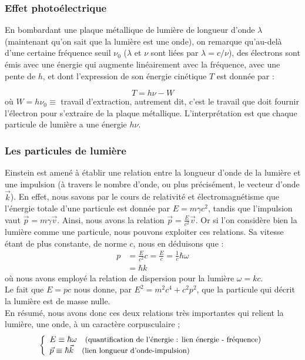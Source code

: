 \documentclass{book}
\begin{document}
\subsubsection{Effet photoélectrique}
En bombardant une plaque métallique de lumière de longueur d'onde $\lambda$ (maintenant qu'on sait que la lumière est une onde), on remarque qu'au-delà d'une certaine fréquence seuil $\nu_0$ ($\lambda$ et $\nu$ sont liées par $\lambda = c/\nu$), des électrons sont émis avec une énergie qui augmente linéairement avec la fréquence, avec une pente de $h$, et dont l'expression de son énergie cinétique $T$ est donnée par :

$$ T = h\nu - W$$
où $W = h \nu_0 \equiv$ travail d'extraction, autrement dit, c'est le travail que doit fournir l'électron pour s'extraire de la plaque métallique. L'interprétation est que chaque particule de lumière a une énergie $h \nu$.

\subsubsection{Les particules de lumière}
Einstein est amené à établir une relation entre la longueur d'onde de la lumière et une impulsion (à travers le nombre d'onde, ou plus précisément, le vecteur d'onde $\vec{k}$).
En effet, nous savons par le cours de relativité et électromagnétisme que l'énergie totale d'une particule est donnée par $E = m \gamma c^2$, tandis que l'impulsion vaut $\vec{p} = m \gamma \vec{v}$. Ainsi, nous avons la relation $\vec{p} = \frac{E}{c^2} \vec{v}$. 
Or si l'on considère bien la lumière comme une particule, nous pouvons exploiter ces relations. Sa vitesse étant de plus constante, de norme $c$, nous en déduisons que : 
\begin{align*}
  p &= \frac{E}{c^2} c = \frac{E}{c} = \frac{1}{c} \hbar \omega \\
  &= \hbar k 
\end{align*}
où nous avons employé la relation de dispersion pour la lumière $\omega = kc$. \\
Le fait que $E = pc$ nous donne, par $E^2 = m^2 c^4 + c^2 p^2$, que la particule qui décrit la lumière est de masse nulle. \\
En résumé, nous avons donc ces deux relations très importantes qui relient la lumière, une onde, à un caractère corpusculaire ; 
\begin{align}
\label{Quantification energie et impulsion}
\left\{ \begin{array}{l}
E \equiv \hbar \omega \quad \text{\small (quantification de l'énergie : lien énergie - fréquence}) \\
\vec{p} \equiv \hbar \vec{k}  \quad \text{\small (lien longueur d'onde-impulsion)}
\end{array} \right.
\end{align}
\end{document}
